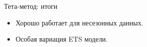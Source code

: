 \begin{frame}{Тета-метод: итоги}

  \begin{itemize}[<+->]
    \item Хорошо работает для \alert{несезонных} данных.
    \item Особая \alert{вариация} ETS модели. 
  \end{itemize}
\end{frame}


